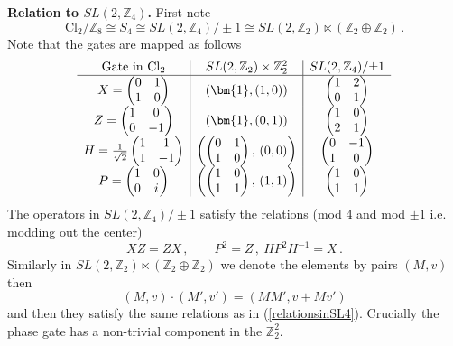 \documentclass[aps,twocolumn,prx,floatfix,preprintnumbers, nofootinbib,10pt]{revtex4-2}
\numberwithin{equation}{section}
\theoremstyle{definition}
\theoremstyle{remark}
\theoremstyle{claim}
\newcommand{\Perm}{S}
\newcommand{\be}{\begin{equation}}
\newcommand{\ee}{\end{equation}}
\newcommand{\Cl}{\text{Cl}}
\newcommand{\Z}{{\mathbb Z}}
\begin{document}
\smallskip

\noindent
{\bf Relation to $SL(2, \Z_4)$.}
First note 
\be
\Cl_2/\Z_8 \cong \Perm_4 \cong SL(2, \Z_4)/{\pm} 1  \cong SL(2, \Z_2) \ltimes (\Z_2 \oplus \Z_2)   \,.
\ee
Note that the gates are mapped as follows 
\be
\begin{array}{c|c|c}
\text{Gate in }\Cl_2 & SL(2, \Z_2) \ltimes \Z_2^2  & SL(2,\Z_4)/ {\pm} 1\cr \hline 
X= \begin{pmatrix}
0 & 1\\
1 & 0
\end{pmatrix} &  (\bm{1},  (1, 0))  &  \begin{pmatrix}
1 & 2\\
0 & 1
\end{pmatrix}\cr 
Z= \begin{pmatrix}
1 & 0 \\
0 & -1
\end{pmatrix} &  (\bm{1},  (0, 1))  &  
\begin{pmatrix}
1 & 0\\
2 & 1
\end{pmatrix}\cr 
H ={1\over \sqrt{2}} \begin{pmatrix}
1& 1 \\
1 & -1
\end{pmatrix}& 
\left(\begin{pmatrix}
0 & 1 \\
1 & 0 
\end{pmatrix} ,\,  (0,0)\right)
&
\begin{pmatrix}
0 & -1 \\
1 & 0
\end{pmatrix}\cr 
P= \begin{pmatrix}
1 & 0\\
0 & i
\end{pmatrix} & \left( \begin{pmatrix}
1 & 0 \\
1 & 1
\end{pmatrix} ,\,  (1,1)\right)
&
\begin{pmatrix}
 1 & 0 \\
 1 & 1
\end{pmatrix}
\end{array}
\ee
The operators in $SL(2,\Z_4)/\pm1$ satisfy the relations (mod 4 and mod $\pm 1$ i.e. modding out the center)
\be\label{relationsinSL4}
X Z =  Z X \,,\qquad P^2 = Z \,,  \ H P^2 H^{-1} = X \,. 
\ee
Similarly in $SL(2,\Z_2) \ltimes (\Z_2 \oplus \Z_2)$ we denote the elements by pairs $(M, v)$ then 
\be
(M, v) \cdot (M' , v') = (M M', v+ M v')
\ee
and then they satisfy the same relations as in (\ref{relationsinSL4}).
Crucially the phase gate has a non-trivial component in the $\Z_2^2$. 
\end{document}
